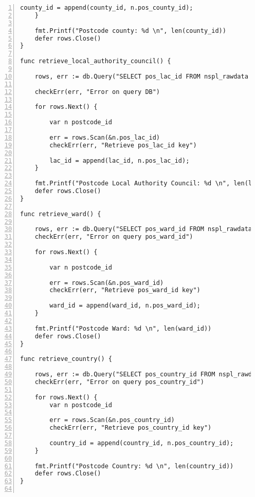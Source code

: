\begin{lstlisting}[breaklines, frame=single, numbers=left, caption={Resource Table Key Retrieval Function.}, label=commandline-02]
		county_id = append(county_id, n.pos_county_id); 
	}
	
	fmt.Printf("Postcode county: %d \n", len(county_id))
	defer rows.Close()
}

func retrieve_local_authority_council() {

	rows, err := db.Query("SELECT pos_lac_id FROM nspl_rawdata AS rawdata JOIN postcode_local_authority_county AS lac ON lac.pos_lac_code = rawdata.county_lac AND lac.pos_lac_name = rawdata.county_lan;" )
	
	checkErr(err, "Error on query DB")	
	
	for rows.Next() {
	
		var n postcode_id
		
		err = rows.Scan(&n.pos_lac_id)
		checkErr(err, "Retrieve pos_lac_id key")
		
		lac_id = append(lac_id, n.pos_lac_id); 
	}
	
	fmt.Printf("Postcode Local Authority Council: %d \n", len(lac_id))
	defer rows.Close()
}

func retrieve_ward() {

	rows, err := db.Query("SELECT pos_ward_id FROM nspl_rawdata AS rawdata JOIN postcode_ward AS ward ON ward.pos_ward_code = rawdata.wardcode AND ward.pos_ward_name = rawdata.wardname;" )
	checkErr(err, "Error on query pos_ward_id")	
	
	for rows.Next() {
	
		var n postcode_id
		
		err = rows.Scan(&n.pos_ward_id)
		checkErr(err, "Retrieve pos_ward_id key")
		
		ward_id = append(ward_id, n.pos_ward_id); 
	}
	
	fmt.Printf("Postcode Ward: %d \n", len(ward_id))
	defer rows.Close()
}

func retrieve_country() {

	rows, err := db.Query("SELECT pos_country_id FROM nspl_rawdata AS rawdata JOIN postcode_country AS country ON country.pos_country_code = rawdata.countrycode AND country.pos_country_name = rawdata.countryname;" )
	checkErr(err, "Error on query pos_country_id")	 
	
	for rows.Next() {
		var n postcode_id
		
		err = rows.Scan(&n.pos_country_id)
		checkErr(err, "Retrieve pos_country_id key")
		
		country_id = append(country_id, n.pos_country_id); 
	}
	
	fmt.Printf("Postcode Country: %d \n", len(country_id))
	defer rows.Close()
}


\end{lstlisting}
